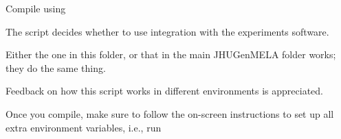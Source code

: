 Compile using


\begin{DoxyCode}{0}
\end{DoxyCode}



\begin{DoxyItemize}
\item The script decides whether to use integration with the experiments\textquotesingle{} software.
\item Either the one in this folder, or that in the main J\+H\+U\+Gen\+M\+E\+LA folder works; they do the same thing.
\item Feedback on how this script works in different environments is appreciated.
\end{DoxyItemize}

Once you compile, make sure to follow the on-\/screen instructions to set up all extra environment variables, i.\+e., run


\begin{DoxyCode}{0}
\end{DoxyCode}
 